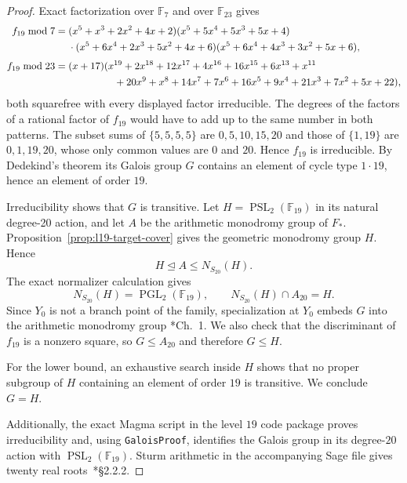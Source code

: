 \documentclass[10pt]{amsart}
\numberwithin{equation}{section}
\theoremstyle{definition}
\theoremstyle{remark}
\newcommand{\F}{\mathbb{F}}
\newcommand{\PGL}{\operatorname{PGL}}
\newcommand{\PSL}{\operatorname{PSL}}
\begin{document}
\begin{proof}
Exact factorization over $\F_7$ and over $\F_{23}$ gives
\begin{align*}
 f_{19}\bmod7={}&
 (x^5+x^3+2x^2+4x+2)(x^5+5x^4+5x^3+5x+4)\\
 &\cdot(x^5+6x^4+2x^3+5x^2+4x+6)(x^5+6x^4+4x^3+3x^2+5x+6),\\[1mm]
 f_{19}\bmod23={}&(x+17)
 (x^{19}+2x^{18}+12x^{17}+4x^{16}+16x^{15}+6x^{13}+x^{11}\\
 &\hspace{16mm}{}+20x^9+x^8+14x^7+7x^6+16x^5+9x^4
 +21x^3+7x^2+5x+22),
\end{align*}
both squarefree with every displayed factor irreducible.  The degrees of the
factors of a rational factor of $f_{19}$ would have to add up to the same
number in both patterns. The subset sums of $\{5,5,5,5\}$ are
$0,5,10,15,20$ and those of $\{1,19\}$ are $0,1,19,20$, whose only common
values are $0$ and $20$.  Hence $f_{19}$ is irreducible.  By Dedekind's theorem its Galois group $G$ contains an element of cycle type
$1\cdot19$, hence an element of order $19$.  

Irreducibility shows that $G$ is transitive.  Let
$H=\PSL_2(\F_{19})$ in its natural degree-20 action, and let $A$ be the
arithmetic monodromy group of $F_*$.  Proposition~\ref{prop:l19-target-cover}
gives the geometric monodromy group $H$.  Hence
\[
 H\trianglelefteq A\leq N_{S_{20}}(H).
\]
 The exact normalizer calculation gives
\[
 N_{S_{20}}(H)=\PGL_2(\F_{19}),\qquad
 N_{S_{20}}(H)\cap A_{20}=H.
\]
Since $Y_0$ is not a branch point of the family, specialization at $Y_0$
embeds $G$ into the arithmetic monodromy group \cite{Serre2008}*{Ch.~1}. We also check that the
discriminant of $f_{19}$ is a nonzero square, so $G\leq A_{20}$ and therefore $G\leq H$.

For the lower bound, an exhaustive search inside $H$ shows that no proper
subgroup of $H$ containing an element of order $19$ is transitive.  We conclude $G=H$. 

Additionally, the exact Magma script in the level $19$ code package proves irreducibility and, using \texttt{GaloisProof},
identifies the Galois group in its degree-$20$ action with
$\PSL_2(\F_{19})$. Sturm arithmetic in the accompanying
Sage file gives twenty real roots~\cite{BasuPollackRoy2006}*{\S2.2.2}.
\end{proof}
\end{document}
